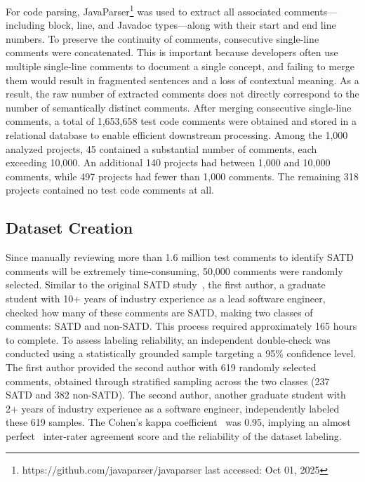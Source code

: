 For code parsing, JavaParser\footnote{https://github.com/javaparser/javaparser last accessed: Oct 01, 2025} was used to extract all associated comments—including block, line, and Javadoc types—along with their start and end line numbers. To preserve the continuity of comments, consecutive single-line comments were concatenated. This is important because developers often use multiple single-line comments to document a single concept, and failing to merge them would result in fragmented sentences and a loss of contextual meaning. As a result, the raw number of extracted comments does not directly correspond to the number of semantically distinct comments. After merging consecutive single-line comments, a total of 1,653,658 test code comments were obtained and stored in a relational database to enable efficient downstream processing. Among the 1,000 analyzed projects, 45 contained a substantial number of comments, each exceeding 10,000. An additional 140 projects had between 1,000 and 10,000 comments, while 497 projects had fewer than 1,000 comments. The remaining 318 projects contained no test code comments at all.

\subsection{Dataset Creation}
Since manually reviewing more than 1.6 million test comments to identify SATD comments will be extremely time-consuming, 50,000 comments were randomly selected. Similar to the original SATD study~\cite{potdar_exploratory_2014}, the first author, a graduate student with 10+ years of industry experience as a lead software engineer, checked how many of these comments are SATD, making two classes of comments: SATD and non-SATD. This process required approximately 165 hours to complete. To assess labeling reliability, an independent double-check was conducted using a statistically grounded sample targeting a 95\% confidence level. The first author provided the second author with 619 randomly selected comments, obtained through stratified sampling across the two classes (237 SATD and 382 non-SATD). The second author, another graduate student with 2+ years of industry experience as a software engineer, independently labeled these 619 samples. The Cohen's kappa coefficient~\cite{cohen_coefficient_1960} was 0.95, implying an almost perfect~\cite{viera2005understanding} inter-rater agreement score and the reliability of the dataset labeling.


